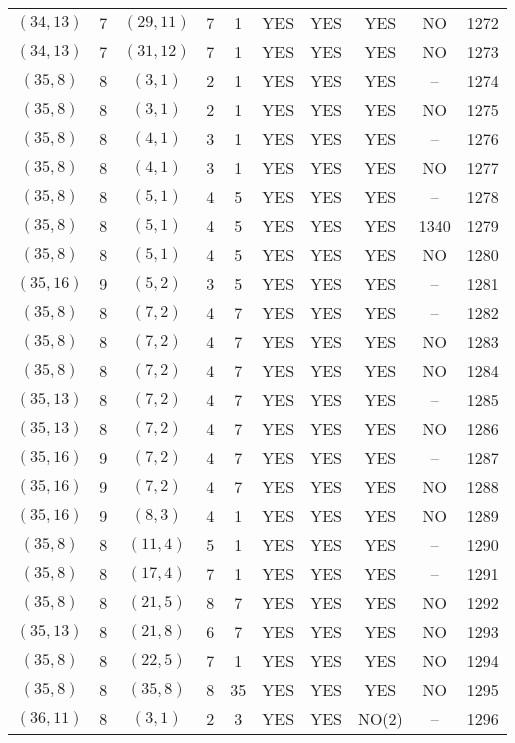 \begin{longtable}{|c|c|c|c|c|c|c|c|c|c|}
$(34, 13)$ & 7 & $(29, 11)$ & 7 & 1 & YES & YES & YES & NO & 1272\\
$(34, 13)$ & 7 & $(31, 12)$ & 7 & 1 & YES & YES & YES & NO & 1273\\
$(35, 8)$ & 8 & $(3, 1)$ & 2 & 1 & YES & YES & YES & -- & 1274\\
$(35, 8)$ & 8 & $(3, 1)$ & 2 & 1 & YES & YES & YES & NO & 1275\\
$(35, 8)$ & 8 & $(4, 1)$ & 3 & 1 & YES & YES & YES & -- & 1276\\
$(35, 8)$ & 8 & $(4, 1)$ & 3 & 1 & YES & YES & YES & NO & 1277\\
$(35, 8)$ & 8 & $(5, 1)$ & 4 & 5 & YES & YES & YES & -- & 1278\\
$(35, 8)$ & 8 & $(5, 1)$ & 4 & 5 & YES & YES & YES & 1340 & 1279\\
$(35, 8)$ & 8 & $(5, 1)$ & 4 & 5 & YES & YES & YES & NO & 1280\\
$(35, 16)$ & 9 & $(5, 2)$ & 3 & 5 & YES & YES & YES & -- & 1281\\
$(35, 8)$ & 8 & $(7, 2)$ & 4 & 7 & YES & YES & YES & -- & 1282\\
$(35, 8)$ & 8 & $(7, 2)$ & 4 & 7 & YES & YES & YES & NO & 1283\\
$(35, 8)$ & 8 & $(7, 2)$ & 4 & 7 & YES & YES & YES & NO & 1284\\
$(35, 13)$ & 8 & $(7, 2)$ & 4 & 7 & YES & YES & YES & -- & 1285\\
$(35, 13)$ & 8 & $(7, 2)$ & 4 & 7 & YES & YES & YES & NO & 1286\\
$(35, 16)$ & 9 & $(7, 2)$ & 4 & 7 & YES & YES & YES & -- & 1287\\
$(35, 16)$ & 9 & $(7, 2)$ & 4 & 7 & YES & YES & YES & NO & 1288\\
$(35, 16)$ & 9 & $(8, 3)$ & 4 & 1 & YES & YES & YES & NO & 1289\\
$(35, 8)$ & 8 & $(11, 4)$ & 5 & 1 & YES & YES & YES & -- & 1290\\
$(35, 8)$ & 8 & $(17, 4)$ & 7 & 1 & YES & YES & YES & -- & 1291\\
$(35, 8)$ & 8 & $(21, 5)$ & 8 & 7 & YES & YES & YES & NO & 1292\\
$(35, 13)$ & 8 & $(21, 8)$ & 6 & 7 & YES & YES & YES & NO & 1293\\
$(35, 8)$ & 8 & $(22, 5)$ & 7 & 1 & YES & YES & YES & NO & 1294\\
$(35, 8)$ & 8 & $(35, 8)$ & 8 & 35 & YES & YES & YES & NO & 1295\\
$(36, 11)$ & 8 & $(3, 1)$ & 2 & 3 & YES & YES & NO(2) & -- & 1296\\

\end{longtable}
